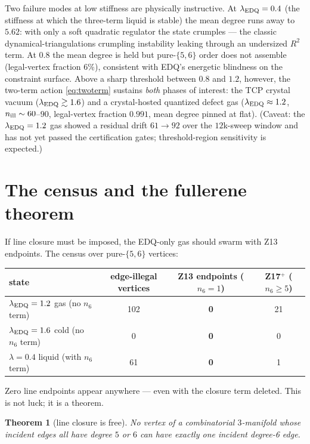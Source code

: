 \documentclass[11pt]{article}
\newtheorem{theorem}{Theorem}
\newcommand{\Nfk}{n_6}
\begin{document}
Two failure modes at low stiffness are physically instructive. At
$\lambda_{\rm EDQ}=0.4$ (the stiffness at which the three-term liquid is
stable) the mean degree runs away to $5.62$: with only a soft quadratic
regulator the state crumples --- the classic dynamical-triangulations
crumpling instability leaking through an undersized $R^2$ term. At $0.8$
the mean degree is held but pure-$\{5,6\}$ order does not assemble
(legal-vertex fraction $6\%$), consistent with EDQ's energetic blindness on
the constraint surface. Above a sharp threshold between $0.8$ and $1.2$,
however, the two-term action \eqref{eq:twoterm} sustains \emph{both} phases
of interest: the TCP crystal vacuum ($\lambda_{\rm EDQ} \gtrsim 1.6$) and a
crystal-hosted quantized defect gas ($\lambda_{\rm EDQ} \approx 1.2$,
$n_{\rm ill} \sim 60$--$90$, legal-vertex fraction $0.991$, mean degree
pinned at flat). (Caveat: the $\lambda_{\rm EDQ}=1.2$ gas showed a residual
drift $61 \to 92$ over the $12$k-sweep window and has not yet passed the
certification gates; threshold-region sensitivity is expected.)

\section{The census and the fullerene theorem}
\label{sec:fullerene}

If line closure must be imposed, the EDQ-only gas should swarm with Z13
endpoints. The census over pure-$\{5,6\}$ vertices:

\begin{center}
\begin{tabular}{lccc}
\toprule
state & edge-illegal vertices & Z13 endpoints ($\Nfk{=}1$) & Z17$^+$ ($\Nfk\geq 5$) \\
\midrule
$\lambda_{\rm EDQ}=1.2$ gas (no $n_6$ term) & 102 & \textbf{0} & 21 \;{\footnotesize($\Nfk = 5{:}14,\; 6{:}5,\; 8{:}2$)} \\
$\lambda_{\rm EDQ}=1.6$ cold (no $n_6$ term) & 0 & \textbf{0} & 0 \\
$\lambda=0.4$ liquid (with $n_6$ term) & 61 & \textbf{0} & 1 \\
\bottomrule
\end{tabular}
\end{center}

Zero line endpoints appear anywhere --- even with the closure term deleted.
This is not luck; it is a theorem.

\begin{theorem}[line closure is free]
No vertex of a combinatorial $3$-manifold whose incident edges all have
degree $5$ or $6$ can have exactly one incident degree-6 edge.
\end{theorem}
\end{document}
